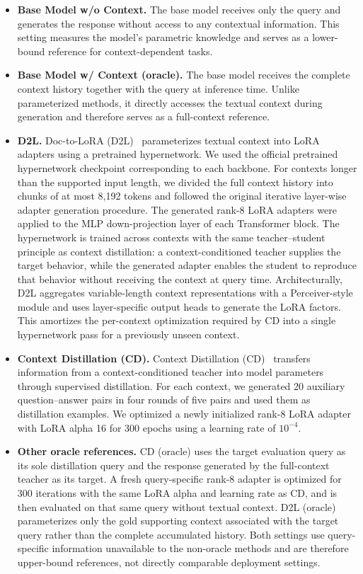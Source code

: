 \begin{itemize}

\item \textbf{Base Model w/o Context.}
The base model receives only the query and generates the response without access to any contextual information. This setting measures the model's parametric knowledge and serves as a lower-bound reference for context-dependent tasks.

\item \textbf{Base Model w/ Context (oracle).}
The base model receives the complete context history together with the query at inference time. Unlike parameterized methods, it directly accesses the textual context during generation and therefore serves as a full-context reference.

\item \textbf{D2L.}
Doc-to-LoRA (D2L)~\citep{charakorn2026doc} parameterizes textual context into LoRA adapters using a pretrained hypernetwork. We used the official pretrained hypernetwork checkpoint corresponding to each backbone. For contexts longer than the supported input length, we divided the full context history into chunks of at most 8,192 tokens and followed the original iterative layer-wise adapter generation procedure. The generated rank-8 LoRA adapters were applied to the MLP down-projection layer of each Transformer block.
The hypernetwork is trained across contexts with the same teacher--student
principle as context distillation: a context-conditioned teacher supplies the
target behavior, while the generated adapter enables the student to reproduce
that behavior without receiving the context at query time. Architecturally,
D2L aggregates variable-length context representations with a
Perceiver-style module and uses layer-specific output heads to generate the
LoRA factors. This amortizes the per-context optimization required by CD into
a single hypernetwork pass for a previously unseen context.

\item \textbf{Context Distillation (CD).}
Context Distillation (CD)~\citep{snell2022learning} transfers information from a context-conditioned teacher into model parameters through supervised distillation. For each context, we generated 20 auxiliary question--answer pairs in four rounds of five pairs and used them as distillation examples. We optimized a newly initialized rank-8 LoRA adapter with LoRA alpha 16 for 300 epochs using a learning rate of $10^{-4}$.

\item \textbf{Other oracle references.}
CD (oracle) uses the target evaluation query as its sole distillation query and the response generated by the full-context teacher as its target. A fresh query-specific rank-8 adapter is optimized for 300 iterations with the same LoRA alpha and learning rate as CD, and is then evaluated on that same query without textual context. D2L (oracle) parameterizes only the gold supporting context associated with the target query rather than the complete accumulated history. Both settings use query-specific information unavailable to the non-oracle methods and are therefore upper-bound references, not directly comparable deployment settings.


\end{itemize}
